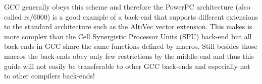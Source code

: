 GCC generally obeys this scheme and therefore the PowerPC architecture (also called rs/6000) is a good example of a back-end that supports different extensions to the standard architecture such as the AltiVec vector extension. This makes is more complex than the Cell Synergistic Processor Units (SPU) back-end but all back-ends in GCC share the same functions defined by macros. Still besides those macros the back-ends obey only few restrictions by the middle-end and thus this guide will not easily be transferable to other GCC back-ends and especially not to other compilers back-ends!
